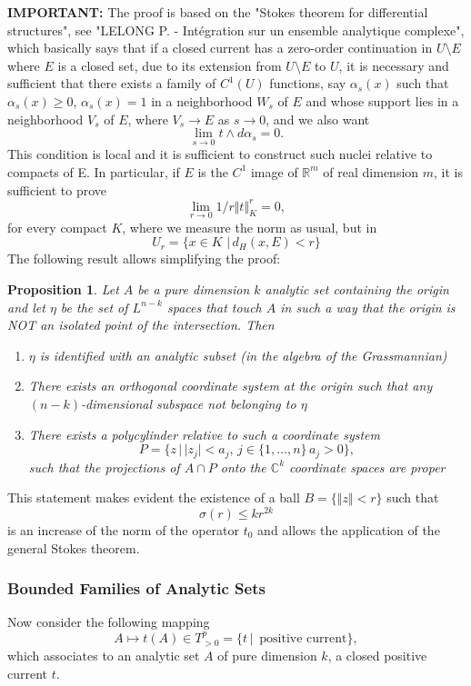 \documentclass[12pt,twoside,a4paper]{report}
\newtheorem{prop}[theorem]{Proposition}
\begin{document}
\noindent \textbf{IMPORTANT:} The proof is based on the "Stokes theorem for differential structures", see "LELONG P. - Intégration sur un ensemble analytique complexe", which basically says that if a closed current has a zero-order continuation in $U\setminus E$ where $E$ is a closed set, due to its extension from $U\setminus E$ to $U$, it is necessary and sufficient that there exists a family of $C^{1}(U)$ functions, say $\alpha_s(x)$ such that $\alpha_s(x)\geq0$, $\alpha_s(x)=1$ in a neighborhood $W_s$ of $E$ and whose support lies in a neighborhood $V_s$ of $E$, where $V_s\rightarrow E$ as $s\rightarrow 0$, and we also want
\[
    \lim_{s\rightarrow 0}t\wedge d\alpha_s=0.
\]
This condition is local and it is sufficient to construct such nuclei relative to compacts of E. In particular, if $E$ is the $C^1$ image of $\mathbb{R}^m$ of real dimension $m$, it is sufficient to prove
\[
    \lim_{r\rightarrow 0}1/r\Vert t\Vert^{r}_K=0,
\]
for every compact $K$, where we measure the norm as usual, but in
\[
 U_r=\{x\in K\,\,\vert\,d_H(x,E)<r\}
\]
The following result allows simplifying the proof:
\begin{prop}
Let $A$ be a pure dimension $k$ analytic set containing the origin and let $\eta$ be the set of $L^{n-k}$ spaces that touch $A$ in such a way that the origin is NOT an isolated point of the intersection. Then
\begin{enumerate}
\item $\eta$ is identified with an analytic subset (in the algebra of the Grassmannian)

\item There exists an orthogonal coordinate system at the origin such that any $(n-k)$-dimensional subspace not belonging to $\eta$

\item There exists a polycylinder relative to such a coordinate system
\[
    P=\{z\,|\,|z_j|<a_j,\,j\in\{1,\dots,n\}\,a_j>0\},
\]
such that the projections of $A\cap P$ onto the $\mathbb{C}^{k}$ coordinate spaces are proper
\end{enumerate}
\end{prop}
This statement makes evident the existence of a ball $B=\{\Vert z\Vert<r\}$ such that
\[
        \sigma(r)\leq kr^{2k}
\]
is an increase of the norm of the operator $t_0$ and allows the application of the general Stokes theorem.

\subsubsection{Bounded Families of Analytic Sets}
\label{sec:org50c0940}
Now consider the following mapping
\[
    A\mapsto t(A)\in T^p_{>0}=\{t\,|\,\text{ positive current}\},
\]
\noindent which associates to an analytic set $A$ of pure dimension $k$, a closed positive current $t$.
\end{document}
